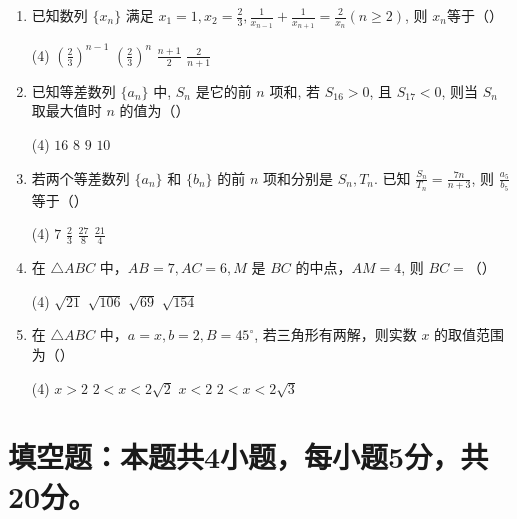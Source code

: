 \documentclass[17pt,twoside,space]{ctexart}
\begin{document}
\begin{enumerate}[itemsep=0.2em,topsep=0pt]
\item 已知数列 $\{x_n\}$ 满足 $x_1=1, x_2=\frac{2}{3}, \frac{1}{x_{n-1}}+\frac{1}{x_{n+1}}=\frac{2}{x_n} (n\geqslant 2)$, 则 $x_n$等于（\hspace{7pt}）
\begin{tasks}(4)
	\task $(\frac{2}{3})^{n-1}$ \task $(\frac{2}{3})^n$ \task $\frac{n+1}{2}$ \task $\frac{2}{n+1}$
\end{tasks}

\item 已知等差数列 $\{a_n\}$ 中, $S_n$ 是它的前 $n$ 项和, 若 $S_{16}>0$, 且 $S_{17}<0$, 则当 $S_n$ 取最大值时 $n$ 的值为（\hspace{7pt}）
\begin{tasks}(4)
	\task $16$ \task $8$ \task $9$ \task $10$ 
\end{tasks}

\item 若两个等差数列 $\{a_n\}$ 和 $\{b_n\}$ 的前 $n$ 项和分别是 $S_n, T_n$. 已知 $\frac{S_n}{T_n}=\frac{7n}{n+3}$, 则 $\frac{a_5}{b_5}$ 等于（\hspace{7pt}）
\begin{tasks}(4)
	\task $7$ \task $\frac{2}{3}$ \task $\frac{27}{8}$ \task $\frac{21}{4}$ 
\end{tasks}

\item 在 $\triangle ABC$ 中，$AB=7, AC=6, M$ 是 $BC$ 的中点，$AM=4$, 则 $BC=$（\hspace{7pt}）
\begin{tasks}(4)
	\task $\sqrt{21}$ \task $\sqrt{106}$ \task $\sqrt{69}$ \task $\sqrt{154}$ 
\end{tasks}

\item 在 $\triangle ABC$ 中，$a=x, b=2, B=45^\circ$, 若三角形有两解，则实数 $x$ 的取值范围为（\hspace{7pt}）
\begin{tasks}(4)
	\task $x>2$ \task $2<x<2\sqrt{2}$ \task $x<2$ \task $2<x<2\sqrt{3}$ 
\end{tasks}

\end{enumerate}


\section{填空题：本题共4小题，每小题5分，共20分。}
\end{document}

